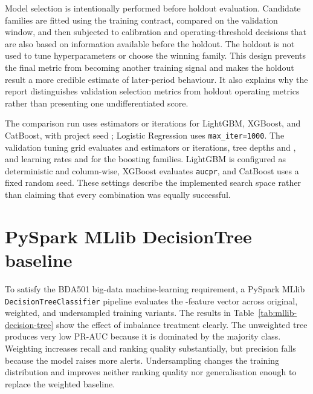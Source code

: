 Model selection is intentionally performed before holdout evaluation. Candidate
families are fitted using the training contract, compared on the validation
window, and then subjected to calibration and operating-threshold decisions
that are also based on information available before the holdout. The holdout
is not used to tune hyperparameters or choose the winning family. This design
prevents the final metric from becoming another training signal and makes the
holdout result a more credible estimate of later-period behaviour. It also
explains why the report distinguishes validation selection metrics from
holdout operating metrics rather than presenting one undifferentiated score.

The comparison run uses  estimators or iterations for LightGBM,
XGBoost, and CatBoost, with project seed ; Logistic Regression uses
\texttt{max\_iter=1000}. The validation tuning grid evaluates  and
 estimators or iterations, tree depths  and , and
learning rates  and  for the boosting families. LightGBM
is configured as deterministic and column-wise, XGBoost evaluates
\texttt{aucpr}, and CatBoost uses a fixed random seed. These settings describe
the implemented search space rather than claiming that every combination was
equally successful.



\section{PySpark MLlib DecisionTree baseline}

To satisfy the BDA501 big-data machine-learning requirement, a PySpark MLlib
\texttt{DecisionTreeClassifier} pipeline evaluates the -feature vector
across original, weighted, and undersampled training variants. The results in
Table~\ref{tab:mllib-decision-tree} show the effect of imbalance treatment
clearly. The unweighted tree produces very low PR-AUC because it is dominated
by the majority class. Weighting increases recall and ranking quality
substantially, but precision falls because the model raises more alerts.
Undersampling changes the training distribution and improves neither ranking
quality nor generalisation enough to replace the weighted baseline.

